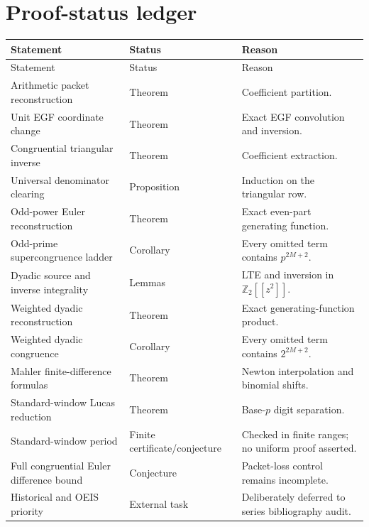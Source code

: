 \documentclass[11pt]{article}
\theoremstyle{definition}
\theoremstyle{remark}
\newcommand{\bbZ}{\mathbb Z}
\begin{document}
\section{Proof-status ledger}

\begin{longtable}{L{0.32\textwidth}L{0.18\textwidth}L{0.40\textwidth}}
\toprule
Statement & Status & Reason\\
\midrule
\endfirsthead
\toprule
Statement & Status & Reason\\
\midrule
\endhead
Arithmetic packet reconstruction & Theorem & Coefficient partition.\\
Unit EGF coordinate change & Theorem & Exact EGF convolution and inversion.\\
Congruential triangular inverse & Theorem & Coefficient extraction.\\
Universal denominator clearing & Proposition & Induction on the triangular row.\\
Odd-power Euler reconstruction & Theorem & Exact even-part generating function.\\
Odd-prime supercongruence ladder & Corollary & Every omitted term contains $p^{2M+2}$.\\
Dyadic source and inverse integrality & Lemmas & LTE and inversion in $\bbZ_2[[z^2]]$.\\
Weighted dyadic reconstruction & Theorem & Exact generating-function product.\\
Weighted dyadic congruence & Corollary & Every omitted term contains $2^{2M+2}$.\\
Mahler finite-difference formulas & Theorem & Newton interpolation and binomial shifts.\\
Standard-window Lucas reduction & Theorem & Base-$p$ digit separation.\\
Standard-window period & Finite certificate/conjecture & Checked in finite ranges; no uniform proof asserted.\\
Full congruential Euler difference bound & Conjecture & Packet-loss control remains incomplete.\\
Historical and OEIS priority & External task & Deliberately deferred to series bibliography audit.\\
\bottomrule
\end{longtable}
\end{document}
